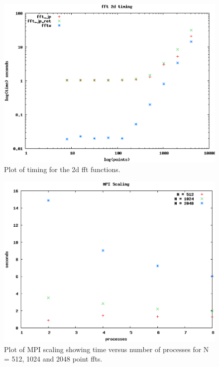 \documentclass[12pt]{article}
\begin{document}
\begin{figure}
\begin{center}
\includegraphics[scale=0.5]{figures/2d_timing.eps} \small \caption{Plot of timing for the 2d fft functions.\label{2d_time}}
\end{center}
\end{figure}

\begin{figure}
\begin{center}
\includegraphics[scale=0.5]{figures/mpi_scaling.eps} \small \caption{Plot of MPI scaling showing time versus number of processes for N = 512, 1024 and 2048 point ffts.\label{scaling}}
\end{center}
\end{figure}
\end{document}
